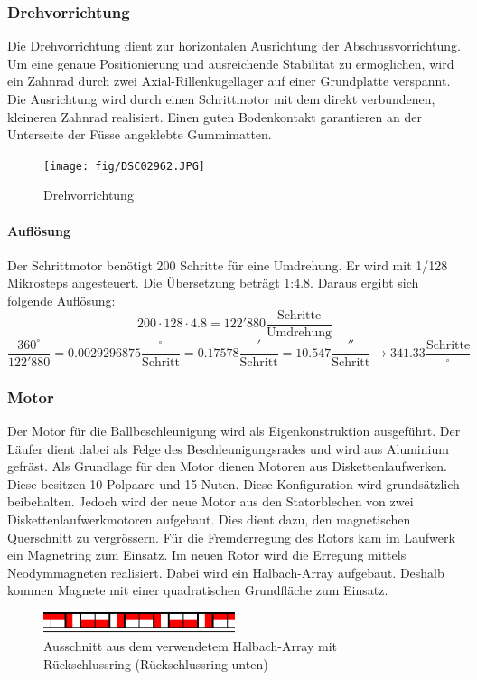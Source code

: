 \subsubsection{Drehvorrichtung}
Die Drehvorrichtung dient zur horizontalen Ausrichtung der 
Abschussvorrichtung. Um eine genaue Positionierung und ausreichende Stabilität 
zu ermöglichen, wird ein Zahnrad durch zwei Axial-Rillenkugellager auf einer 
Grundplatte verspannt. Die Ausrichtung wird durch einen Schrittmotor mit dem 
direkt verbundenen, kleineren Zahnrad realisiert. Einen guten Bodenkontakt 
garantieren an der Unterseite der Füsse angeklebte Gummimatten.

\begin{figure}[h!]
    \centering
    \texttt{[image: fig/DSC02962.JPG]}
    \caption{Drehvorrichtung}
    \label{fig:drehvorrichtung}
\end{figure}

\paragraph{Auflösung}
Der Schrittmotor benötigt 200 Schritte für eine Umdrehung. Er wird mit 1/128 
Mikrosteps angesteuert. Die Übersetzung beträgt 1:4.8. Daraus ergibt sich 
folgende Auflösung: 
\[ 200 \cdot 128 \cdot 4.8 = 122'880 \frac{\text{Schritte}}{\text{Umdrehung}}  \]
\[ \frac{360^\circ}{122'880} = 0.0029296875 \frac{^\circ}{\text{Schritt}} 
= 0.17578 \frac{'}{\text{Schritt}} = 10.547 \frac{''}{\text{Schritt}}
\rightarrow 341.33 \frac{\text{Schritte}}{^\circ}\]

\subsubsection{Motor}
Der Motor für die Ballbeschleunigung wird als Eigenkonstruktion ausgeführt.  
Der Läufer dient dabei als Felge des Beschleunigungsrades und wird aus 
Aluminium gefräst. Als Grundlage für den Motor dienen Motoren aus 
Diskettenlaufwerken. Diese besitzen 10 Polpaare und 15 Nuten. Diese 
Konfiguration wird grundsätzlich beibehalten. Jedoch wird der neue Motor aus 
den Statorblechen von zwei Diskettenlaufwerkmotoren aufgebaut. Dies dient 
dazu, den magnetischen Querschnitt zu vergrössern. Für die Fremderregung des 
Rotors kam im Laufwerk ein Magnetring zum Einsatz. Im neuen Rotor wird die 
Erregung mittels Neodymmagneten realisiert. Dabei wird ein Halbach-Array 
aufgebaut. Deshalb kommen Magnete mit einer quadratischen Grundfläche zum 
Einsatz. 
\begin{figure}[h!]
    \centering
    \includegraphics[width=0.5\textwidth]{fig/halbach.pdf}
    \caption{Ausschnitt aus dem verwendetem Halbach-Array mit Rückschlussring (Rückschlussring unten)}
    \label{fig:halbach}
\end{figure}

